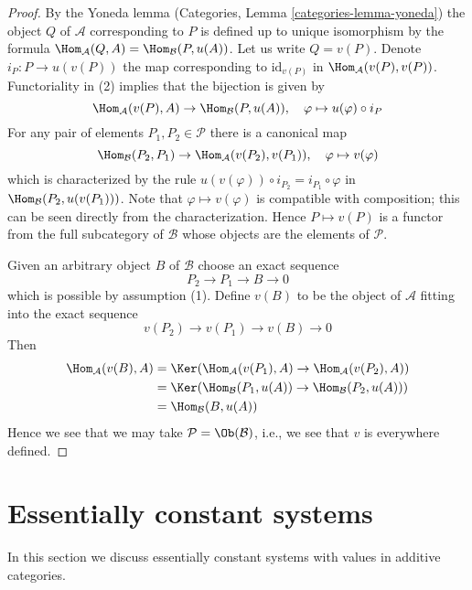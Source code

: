 \begin{proof}
By the Yoneda lemma (Categories, Lemma \ref{categories-lemma-yoneda})
the object $Q$ of $\mathcal{A}$ corresponding to $P$ is defined up to
unique isomorphism by the formula
$\Hom_\mathcal{A}(Q, A) = \Hom_\mathcal{B}(P, u(A))$. Let us write
$Q = v(P)$. Denote $i_P : P \to u(v(P))$ the map corresponding to
$\text{id}_{v(P)}$ in $\Hom_\mathcal{A}(v(P), v(P))$. Functoriality
in (2) implies that the bijection is given by
$$
\Hom_\mathcal{A}(v(P), A) \to \Hom_\mathcal{B}(P, u(A)),\quad
\varphi \mapsto u(\varphi) \circ i_P
$$
For any pair of elements $P_1, P_2 \in \mathcal{P}$ there is a canonical map
$$
\Hom_\mathcal{B}(P_2, P_1)
\to
\Hom_\mathcal{A}(v(P_2), v(P_1)),\quad
\varphi \mapsto v(\varphi)
$$
which is characterized by the rule
$u(v(\varphi)) \circ i_{P_2} = i_{P_1} \circ \varphi$ in
$\Hom_\mathcal{B}(P_2, u(v(P_1)))$.
Note that $\varphi \mapsto v(\varphi)$ is
compatible with composition; this can be seen directly
from the characterization. Hence $P \mapsto v(P)$ is a functor from
the full subcategory of $\mathcal{B}$ whose objects are the elements
of $\mathcal{P}$.

\medskip\noindent
Given an arbitrary object $B$ of $\mathcal{B}$ choose an exact sequence
$$
P_2 \to P_1 \to B \to 0
$$
which is possible by assumption (1). Define $v(B)$ to be the object of
$\mathcal{A}$ fitting into the exact sequence
$$
v(P_2) \to v(P_1) \to v(B) \to 0
$$
Then
\begin{align*}
\Hom_\mathcal{A}(v(B), A)
& =
\Ker(\Hom_\mathcal{A}(v(P_1), A) \to \Hom_\mathcal{A}(v(P_2), A)) \\
& =
\Ker(\Hom_\mathcal{B}(P_1, u(A)) \to \Hom_\mathcal{B}(P_2, u(A))) \\
& =
\Hom_\mathcal{B}(B, u(A))
\end{align*}
Hence we see that we may take $\mathcal{P} = \Ob(\mathcal{B})$, i.e., we
see that $v$ is everywhere defined.
\end{proof}




\section{Essentially constant systems}
\label{section-essentially-constant}

\noindent
In this section we discuss essentially constant systems with values in
additive categories.

